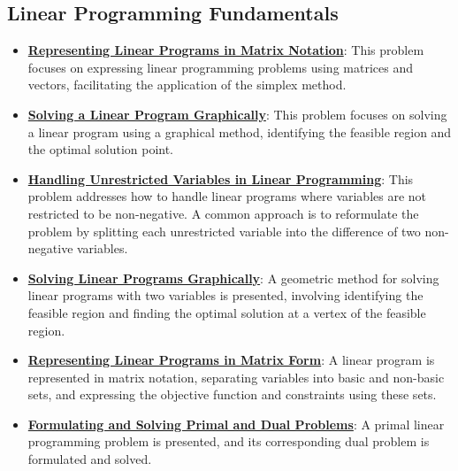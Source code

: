 \documentclass{article}%
\begin{document}
\subsection{Linear Programming Fundamentals}%
\label{subsec:LinearProgrammingFundamentals}%
\begin{itemize}[leftmargin=*]%
\item \href{https://www.math.purdue.edu/~yipn/421/2024-09-24-SimplexMatrix.pdf#page=1}{\textbf{Representing Linear Programs in Matrix Notation}}: This problem focuses on expressing linear programming problems using matrices and vectors, facilitating the application of the simplex method.%
\item \href{https://www.math.purdue.edu/~yipn/421/2024-09-24-SimplexMatrix.pdf#page=21}{\textbf{Solving a Linear Program Graphically}}: This problem focuses on solving a linear program using a graphical method, identifying the feasible region and the optimal solution point.%
\item \href{https://www.math.purdue.edu/~yipn/421/2024-10-01-DualGeneralLP.pdf#page=2}{\textbf{Handling Unrestricted Variables in Linear Programming}}: This problem addresses how to handle linear programs where variables are not restricted to be non-negative. A common approach is to reformulate the problem by splitting each unrestricted variable into the difference of two non-negative variables.%
\item \href{https://www.math.purdue.edu/~yipn/421/2024-12-03-Duality.pdf#page=3}{\textbf{Solving Linear Programs Graphically}}: A geometric method for solving linear programs with two variables is presented, involving identifying the feasible region and finding the optimal solution at a vertex of the feasible region.%
\item \href{https://www.math.purdue.edu/~yipn/421/2024-12-03-Duality.pdf#page=22}{\textbf{Representing Linear Programs in Matrix Form}}: A linear program is represented in matrix notation, separating variables into basic and non-basic sets, and expressing the objective function and constraints using these sets.%
\item \href{https://www.math.purdue.edu/~yipn/421/2024-12-03-Duality.pdf#page=29}{\textbf{Formulating and Solving Primal and Dual Problems}}: A primal linear programming problem is presented, and its corresponding dual problem is formulated and solved.%
\end{itemize}

%
\end{document}
